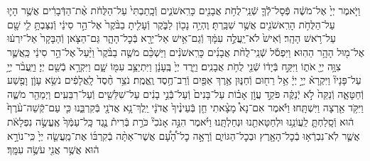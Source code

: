 \documentclass[twoside, openany, parskip=half, 11pt]{book}
\begin{document}
\begin{footnotesize}
\begin{multicols}{2}

\\
\\
וַיֹּ֤אמֶר יְיָ֙ אֶל־מֹשֶׁ֔ה פְּֿסָל־לְֿֿךָ֛ שְֿׁנֵֽי־לֻחֹ֥ת אֲבָנִ֖ים כָּרִֽאשֹׁנִ֑ים וְֿכָֽתַבְתִּי֙ עַל־הַלֻּחֹ֔ת אֶ֨ת־הַדְּֿבָרִ֔ים אֲשֶׁ֥ר הָי֛וּ עַל־הַלֻּחֹ֥ת הָרִֽאשֹׁנִ֖ים אֲשֶׁ֥ר שִׁבַּֽרְתָּ׃ וֶהְיֵ֥ה נָכ֖וֹן לַבֹּ֑קֶר וְֿעָלִ֤יתָ בַבֹּ֨קֶר֙ אֶל־הַ֣ר סִינַ֔י וְֿנִצַּבְתָּ֥ לִ֛י שָׁ֖ם עַל־רֹ֥אשׁ הָהָֽר׃ וְֿאִישׁ֙ לֹא־יַֽעֲלֶ֣ה עִמָּ֔ךְ וְֿגַם־אִ֥ישׁ אַל־יֵרָ֖א בְּֿכׇל־הָהָ֑ר גַּם־הַצֹּ֤אן וְֿהַבָּקָר֙ אַל־יִרְע֔וּ אֶל־מ֖וּל הָהָ֥ר הַהֽוּא׃ וַיִּפְסֹ֡ל שְֿׁנֵֽי־לֻחֹ֨ת אֲבָנִ֜ים כָּרִֽאשֹׁנִ֗ים וַיַּשְׁכֵּ֨ם מֹשֶׁ֤ה בַבֹּ֨קֶר֙ וַיַּ֨עַל֙ אֶל־הַ֣ר סִינַ֔י כַּֽאֲשֶׁ֛ר צִוָּ֥ה יְיָ֖ אֹת֑וֹ וַיִּקַּ֣ח בְּֿיָד֔וֹ שְֿׁנֵ֖י לֻחֹ֥ת אֲבָנִֽים׃ וַיֵּ֤רֶד יְיָ֙ בֶּֽעָנָ֔ן וַיִּתְיַצֵּ֥ב עִמּ֖וֹ שָׁ֑ם וַיִּקְרָ֥א בְֿשֵׁ֖ם יְיָ׃ וַיַּֽעֲבֹ֨ר יְיָ֥ עַל־פָּנָיו֘ וַיִּקְרָא֒ יְיָ֣ יְיָ֔ אֵ֥ל רַח֖וּם וְֿחַנּ֑וּן אֶ֥רֶךְ אַפַּ֖יִם וְֿרַב־חֶ֥סֶד וֶֽאֱמֶֽת׃ נֹצֵ֥ר חֶ֨סֶד֙ לָֽאֲלָפִ֔ים נֹשֵׂ֥א עָוֹ֛ן וָפֶ֖שַׁע וְֿחַטָּאָ֑ה וְֿנַקֵּה֙ לֹ֣א יְֿנַקֶּ֔ה פֹּקֵ֣ד עֲוֹ֣ן אָב֗וֹת עַל־בָּנִים֙ וְֿעַל־בְּֿֿנֵ֣י בָנִ֔ים עַל־שִׁלֵּשִׁ֖ים וְֿעַל־רִבֵּעִֽים׃ וַיְמַהֵ֖ר מֹשֶׁ֑ה וַיִּקֹּ֥ד אַ֖רְצָה וַיִּשְׁתָּֽחוּ׃ וַיֹּ֡אמֶר אִם־נָא֩ מָצָ֨אתִי חֵ֤ן בְּֿעֵינֶ֨יךָ֙ אֲדֹנָ֔י יֵֽלֶךְ־נָ֥א אֲדֹנָ֖י בְּֿקִרְבֵּ֑נוּ כִּ֤י עַם־קְֿשֵׁה־עֹ֨רֶף֙ ה֔וּא וְֿסָֽלַחְתָּ֛ לַֽעֲוֹנֵ֥נוּ וּלְחַטָּאתֵ֖נוּ וּנְחַלְתָּֽנוּ׃ וַיֹּ֗אמֶר הִנֵּ֣ה אָנֹכִי֘ כֹּרֵ֣ת בְּֿרִית֒ נֶ֤גֶד כָּֽל־עַמְּֿךָ֙ אֶֽעֱשֶׂ֣ה נִפְלָאֹ֔ת אֲשֶׁ֛ר לֹֽא־נִבְרְֿא֥וּ בְֿכׇל־הָאָ֖רֶץ וּבְכׇל־הַגּוֹיִ֑ם וְֿרָאָ֣ה כׇל־הָ֠עָ֠ם אֲשֶׁר־אַתָּ֨ה בְֿקִרְבּ֜וֹ אֶת־מַֽעֲשֵׂ֤ה יְיָ֙ כִּֽי־נוֹרָ֣א ה֔וּא אֲשֶׁ֥ר אֲנִ֖י עֹשֶׂ֥ה עִמָּֽךְ׃

\end{multicols}
\end{footnotesize}
\end{document}
